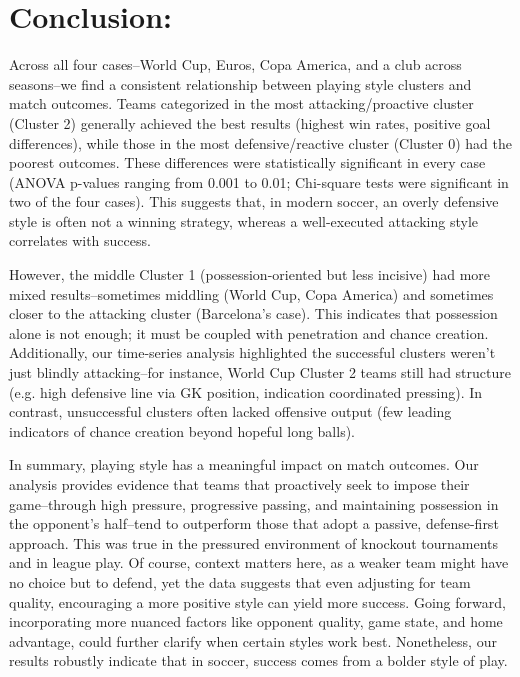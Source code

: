 \documentclass[11pt]{article}
\begin{document}
\section{Conclusion:}
Across all four cases--World Cup, Euros, Copa America, and a club across seasons--we find a consistent relationship between playing style clusters and match outcomes. Teams categorized in the most attacking/proactive cluster (Cluster 2) generally achieved the best results (highest win rates, positive goal differences), while those in the most defensive/reactive cluster (Cluster 0) had the poorest outcomes. These differences were statistically significant in every case (ANOVA p-values ranging from 0.001 to 0.01; Chi-square tests were significant in two of the four cases). This suggests that, in modern soccer, an overly defensive style is often not a winning strategy, whereas a well-executed attacking style correlates with success. 
\newline

However, the middle Cluster 1 (possession-oriented but less incisive) had more mixed results--sometimes middling (World Cup, Copa America) and sometimes closer to the attacking cluster (Barcelona's case). This indicates that possession alone is not enough; it must be coupled with penetration and chance creation. Additionally, our time-series analysis highlighted the successful clusters weren't just blindly attacking--for instance, World Cup Cluster 2 teams still had structure (e.g. high defensive line via GK position, indication coordinated pressing). In contrast, unsuccessful clusters often lacked offensive output (few leading indicators of chance creation beyond hopeful long balls). 
\newline

In summary, playing style has a meaningful impact on match outcomes. Our analysis provides evidence that teams that proactively seek to impose their game--through high pressure, progressive passing, and maintaining possession in the opponent's half--tend to outperform those that adopt a passive, defense-first approach. This was true in the pressured environment of knockout tournaments and in league play. Of course, context matters here, as a weaker team might have no choice but to defend, yet the data suggests that even adjusting for team quality, encouraging a more positive style can yield more success. Going forward, incorporating more nuanced factors like opponent quality, game state, and home advantage, could further clarify when certain styles work best. Nonetheless, our results robustly indicate that in soccer, success comes from a bolder style of play. 
\end{document}
